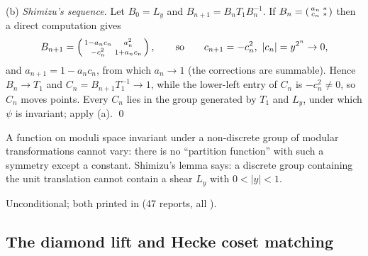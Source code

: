 (b) \emph{Shimizu's sequence.}  Let $B_0=L_y$ and $B_{n+1}=B_nT_1B_n^{-1}$.  If $B_n=\left(\begin{smallmatrix}a_n&*\\c_n&*\end{smallmatrix}\right)$ then
a direct computation gives
\begin{equation*}
  B_{n+1}=\left(\begin{smallmatrix}1-a_nc_n&a_n^2\\-c_n^2&1+a_nc_n\end{smallmatrix}\right),
  \qquad\text{so}\qquad c_{n+1}=-c_n^2,\ |c_n|=y^{2^n}\to0,
\end{equation*}
and $a_{n+1}=1-a_nc_n$, from which $a_n\to1$ (the corrections are summable).  Hence $B_n\to T_1$ and
$C_n=B_{n+1}T_1^{-1}\to1$, while the lower-left entry of $C_n$ is $-c_n^2\neq0$, so $C_n$ moves points.  Every $C_n$
lies in the group generated by $T_1$ and $L_y$, under which $\psi$ is invariant; apply (a). \qed
\begin{physics}
A function on moduli space invariant under a non-discrete group of modular transformations cannot vary: there is no
``partition function'' with such a symmetry except a constant.  Shimizu's lemma says: a discrete group containing the
unit translation cannot contain a shear $L_y$ with $0<|y|<1$.
\end{physics}
\begin{status}
Unconditional; both printed in  (47 reports, all
).
\end{status}

\subsection{The diamond lift and Hecke coset matching}

